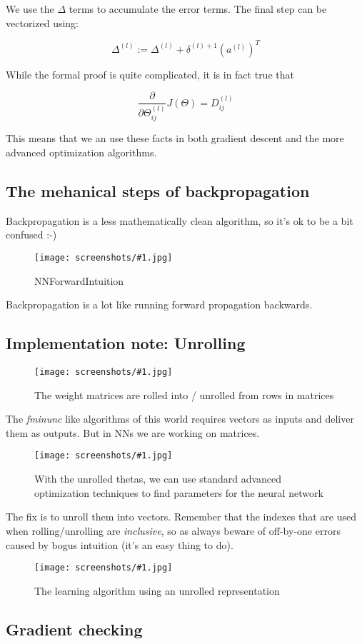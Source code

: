 \documentclass[a4, 12pt, english, USenglish]{scrreprt}
\newcommand{\screenshot}[2]{
\begin{figure}[htb]
\texttt{[image: screenshots/\#1.jpg]}
\label{#1}
\caption{#2}
\end{figure}}
\newcommand{\idx}[1]{{\em #1}\index{#1}}
\begin{document}
We use the \(\Delta\) terms to accumulate the error terms.  The final
step can be vectorized using:

\[
{\Delta}^{(l)} := {\Delta}^{(l)} + {\delta}^{(l)+1} ({a}^{(l)})^T
\]

While the formal proof is quite complicated, it is in fact true that 

\[
\frac{\partial}{\partial{\Theta^{(l)}_{ij}}} J(\Theta) = {D}^{(l)}_{ij}
\]


This means that we an use these facts in both gradient descent and the
more advanced optimization algorithms.

\subsection{The mehanical steps of backpropagation}

Backpropagation is a less mathematically clean algorithm, so it's ok
to be a  bit confused :-)

\screenshot{NNForwardIntuition}{NNForwardIntuition}

Backpropagation is a lot like running forward propagation backwards.

\subsection{Implementation note: Unrolling}

\screenshot{NNunroll}{The weight matrices are rolled into / unrolled
  from rows in matrices }


The \idx{fminunc} like algorithms of this world requires vectors as
inputs and deliver them as outputs.   But in NNs we are working on
matrices.


\cleardoublepage

\screenshot{NNunroll1}{With the unrolled thetas, we can use standard
  advanced optimization techniques to find parameters for the neural network}


The fix is to unroll them into vectors.  Remember that the indexes
that are used when rolling/unrolling are {\em inclusive}, so as always
beware of off-by-one errors caused by bogus intuition (it's an easy
thing to do).

\screenshot{NNUnrolledLearningAlgorithm}{The learning algorithm using
  an unrolled representation}

\subsection{Gradient checking}
\end{document}
